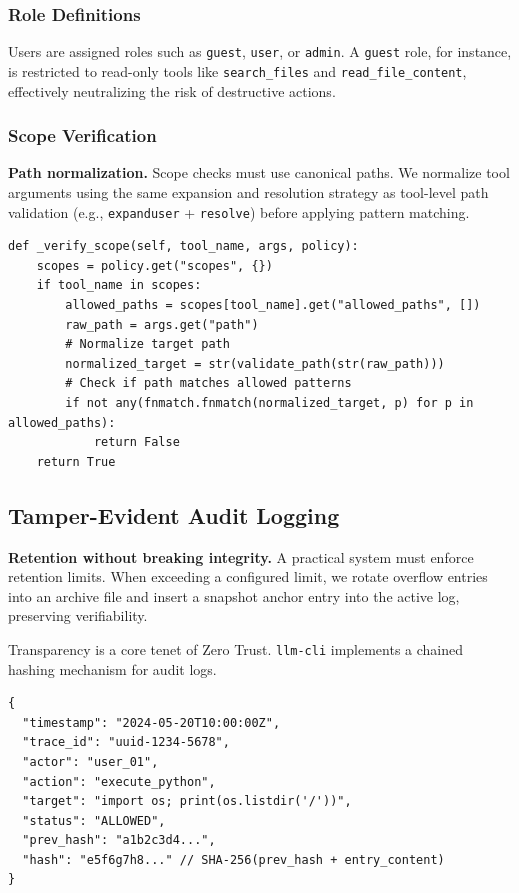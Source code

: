 \documentclass[conference]{IEEEtran}
\begin{document}
\subsubsection{Role Definitions}
Users are assigned roles such as \texttt{guest}, \texttt{user}, or \texttt{admin}. A \texttt{guest} role, for instance, is restricted to read-only tools like \texttt{search\_files} and \texttt{read\_file\_content}, effectively neutralizing the risk of destructive actions.

\subsubsection{Scope Verification}
\textbf{Path normalization.} Scope checks must use canonical paths. We normalize tool arguments using the same expansion and resolution strategy as tool-level path validation (e.g., \texttt{expanduser} + \texttt{resolve}) before applying pattern matching.

\begin{lstlisting}[caption={Scope Verification Logic}, label={lst:scope}]
def _verify_scope(self, tool_name, args, policy):
    scopes = policy.get("scopes", {})
    if tool_name in scopes:
        allowed_paths = scopes[tool_name].get("allowed_paths", [])
        raw_path = args.get("path")
        # Normalize target path
        normalized_target = str(validate_path(str(raw_path)))
        # Check if path matches allowed patterns
        if not any(fnmatch.fnmatch(normalized_target, p) for p in allowed_paths):
            return False
    return True
\end{lstlisting}

\subsection{Tamper-Evident Audit Logging}
\textbf{Retention without breaking integrity.} A practical system must enforce retention limits. When exceeding a configured limit, we rotate overflow entries into an archive file and insert a snapshot anchor entry into the active log, preserving verifiability.

Transparency is a core tenet of Zero Trust. \texttt{llm-cli} implements a chained hashing mechanism for audit logs.

\begin{lstlisting}[caption={Audit Log Entry Structure with Chained Hashing}, label={lst:auditlog}]
{
  "timestamp": "2024-05-20T10:00:00Z",
  "trace_id": "uuid-1234-5678",
  "actor": "user_01",
  "action": "execute_python",
  "target": "import os; print(os.listdir('/'))",
  "status": "ALLOWED",
  "prev_hash": "a1b2c3d4...", 
  "hash": "e5f6g7h8..." // SHA-256(prev_hash + entry_content)
}
\end{lstlisting}
\end{document}
